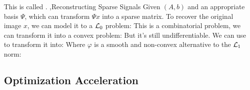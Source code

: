 \documentclass[10pt]{report}
\begin{document}
This is called .
\sep{Reconstructing Sparse Signals}
Given $(A,b)$ and an appropriate basis $\Psi$, which can transform $\Psi x$ into a sparse matrix. To recover the original image $x$,
we can model it to a $\mathcal{L}_0$ problem:
This is a combinatorial problem, we can transform it into a convex problem:
But it's still undifferentiable. We can use  to transform it into:
Where $\varphi$ is a smooth and non-convex alternative to the $\mathcal{L}_1$ norm:

\subsection{Optimization Acceleration}
\end{document}
